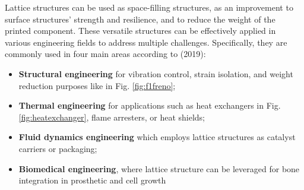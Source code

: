 Lattice structures can be used as space-filling structures, as an improvement to surface structures' strength and resilience, and to reduce the weight of the printed component. These versatile structures can be effectively applied in various engineering fields to address multiple challenges. Specifically, they are commonly used in four main areas according to \citeauthor{bhate_classification_2019} (2019): 
\begin{itemize}
    \item \textbf{Structural engineering} for vibration control, strain isolation, and weight reduction purposes like in Fig. \ref{fig:f1freno};
    \item \textbf{Thermal engineering} for applications such as heat exchangers in Fig. \ref{fig:heatexchanger}, flame arresters, or heat shields;
    \item \textbf{Fluid dynamics engineering} which employs lattice structures as catalyst carriers or packaging;
    \item \textbf{Biomedical engineering}, where lattice structure can be leveraged for bone integration in prosthetic and cell growth
\end{itemize}
